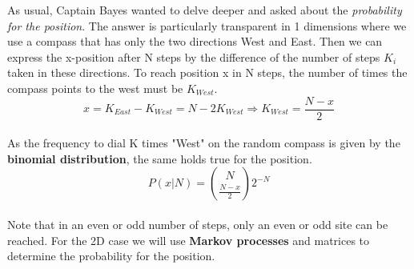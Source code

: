 \documentclass[12pt, a4paper]{scrartcl}
\begin{document}
As usual, Captain Bayes wanted to delve deeper and asked about the \textit{probability for the position}. The answer is particularly transparent in 1 dimensions where we use a compass that has only the two directions West and East.
Then we can express the x-position after N steps by the difference of the number of steps $K_i$ taken in these directions.
To reach position x in N steps, the number of times the compass points to the west must be $K_{West}$.
\begin{equation*}\boxed{x = K_{East} - K_{West} = N - 2K_{West}\Rightarrow K_{West}=\frac{N-x}{2}
}\end{equation*}\\
As the frequency to dial K times "West" on the random compass is given by the \textbf{binomial distribution}, the same holds true for the position.
\begin{equation*}\boxed{P(x|N)={N\choose \frac{N-x}{2}} 2^{-N}
}\end{equation*}\\
Note that in an even or odd number of steps, only an even or odd site can be reached.
For the 2D case we will use \textbf{Markov processes} and matrices to determine the probability for the position.\\
\end{document}
